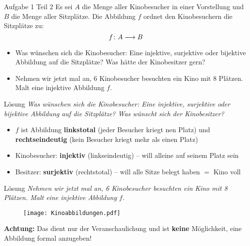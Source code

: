 \begin{frame}{Aufgabe 1 Teil 2} %
	Es sei $A$ die Menge aller Kinobesucher in einer Vorstellung und $B$ die Menge aller Sitzplätze. Die Abbildung $f$ ordnet den Kinobesuchern die Sitzplätze zu:
	$$ f \colon A \longrightarrow B$$
	\begin{itemize}
		\item Was wünschen sich die Kinobesucher: Eine injektive, surjektive oder bijektive Abbildung auf die Sitzplätze? Was hätte der Kinobesitzer gern?
		\item Nehmen wir jetzt mal an, 6 Kinobesucher besuchten ein Kino mit 8 Plätzen. Malt eine injektive Abbildung $f$.
	\end{itemize}
	
\end{frame}

\begin{frame}{Lösung}
	\textit{Was wünschen sich die Kinobesucher: Eine injektive, surjektive oder bijektive Abbildung auf die Sitzplätze? Was wünscht sich der Kinobesitzer?} \\[2em] \pause
	\begin{itemize}[<+->]
		\item $f$ ist Abbildung \impl \textbf{linkstotal} (jeder Besucher kriegt nen Platz) und \textbf{rechtseindeutig} (kein Besucher kriegt mehr als einen Platz)
		\item Kinobesucher: \textbf{injektiv} (linkseindeutig) – will alleine auf seinem Platz sein
		\item Besitzer: \textbf{surjektiv} (rechtstotal) – will alle Sitze belegt haben $=$ Kino voll
	\end{itemize}
\end{frame}

\begin{frame}{Lösung}
	\textit{Nehmen wir jetzt mal an, 6 Kinobesucher besuchten ein Kino mit 8 Plätzen. Malt eine injektive Abbildung $f$.} \\[2em] \pause
	
	\begin{figure}[H]
		\centering
		\texttt{[image: Kinoabbildungen.pdf]}
	\end{figure}

	\textbf{Achtung:} Das dient nur der Veranschaulichung und ist \textbf{keine} Möglichkeit, eine Abbildung formal anzugeben!
\end{frame}

%	
%	

